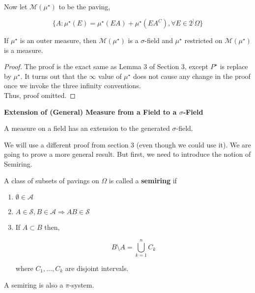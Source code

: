 \documentclass[11pt,fleqn]{book} %
\begin{document}
Now let $\mathcal{M}(\mu^\star)$ to be the paving, 

		$$\{A: \mu^\star(E) = \mu^\star(EA) + \mu^\star(EA^C), \forall E \in 2^]\Omega \} $$


\begin{theorem}
	If $\mu^\star$ is an outer measure, then $\mathcal{M}(\mu^\star)$ is a $\sigma$-field and $\mu^\star$ restricted on  $\mathcal{M}(\mu^\star)$ is a measure. 
\end{theorem}


\begin{proof}
	The proof is the exact same as Lemma 3 of Section 3, except $P^\star$ is replace by $\mu^\star$. It turns out that the $\infty$ value of $\mu^\star$ does not cause any change in the proof once we invoke the three infinity conventions. \\

	Thus, proof omitted.
\end{proof}

\textbf{Extension of (General) Measure from a Field to a $\sigma$-Field}\\

\begin{theorem}
	A measure on a field has an extension to the generated $\sigma$-field. \\

\end{theorem}


We will use a different proof from section 3 (even though we could use it). We are going to prove a more general result. But first, we need to introduce the notion of Semiring.

\begin{definition}[Semiring]
	A class of subsets of pavings on $\Omega$ is called a \textbf{semiring} if 

	\begin{enumerate}
		\item $\emptyset \in \mathcal{A}$
		\item $A \in \mathcal{S}, B \in \mathcal{A} \Rightarrow AB \in \mathcal{S}$
		\item If $A \subset B$ then, 

				$$B \setminus A = \bigcup^n_{k=1} C_k $$

			where $C_1, \dots, C_k$ are disjoint intervals. 
	\end{enumerate}

	A semiring is also a $\pi$-system.
\end{definition}
\end{document}
